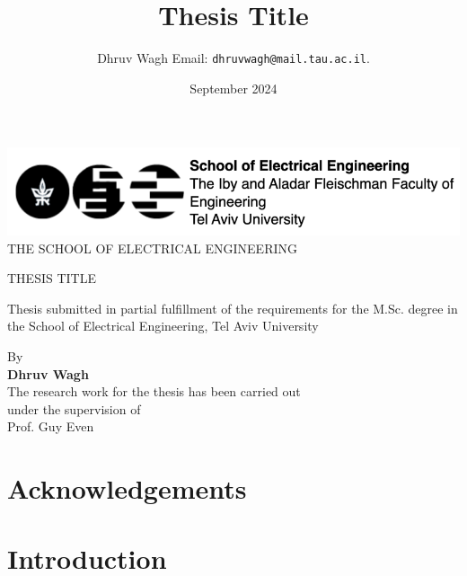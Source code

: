 \documentclass[11pt]{article}
\title{Thesis Title}
\author{
Dhruv Wagh
Email: {\tt dhruvwagh@mail.tau.ac.il}.}
\date{September 2024}
\begin{document}
\begin{titlepage}
    \begin{center}
        \vspace*{0.5cm}
        \includegraphics{TAU_english_logo.png}\\
        \vspace{0.3cm}
        {\Large THE SCHOOL OF ELECTRICAL ENGINEERING}\\
        \vspace{1.2cm}
        {\huge THESIS TITLE\par}
        \vspace{0.8cm}
        {\Large Thesis submitted in partial fulfillment of the requirements for the M.Sc. degree in the School of Electrical Engineering, Tel Aviv University\par}
        \vspace{0.8cm}
        {\Large By}\\
        \vspace{0.3cm}
        {\LARGE \textbf{Dhruv Wagh}}\\       \vspace{1.2cm}
        {\Large The research work for the thesis has been carried out}\\
        \vspace{0.3cm}
        {\Large under the supervision of}\\
        \vspace{0.3cm}
        {\huge Prof. Guy Even}
    \end{center}
\end{titlepage}

\section*{Acknowledgements}
\lipsum[1]
\pagebreak

\begin{abstract}
\end{abstract}
\pagebreak

\tableofcontents
\pagebreak

\section{Introduction}
\end{document}
